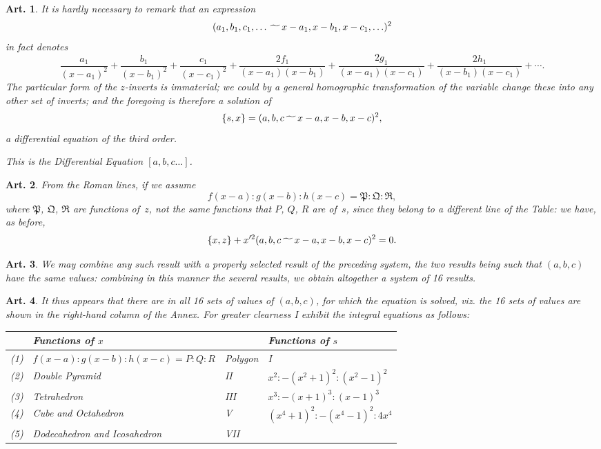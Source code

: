 \documentclass[11pt,a4paper]{article}
\theoremstyle{plain}
\newtheorem{art}{Art.}[section]
\begin{document}
\begin{art}
It is hardly necessary to remark that an expression
\[
(a_1, b_1, c_1, \ldots \,\raisebox{-.5ex}{$\widetilde{\phantom{aa}}$}\, x-a_1, x-b_1, x-c_1, \ldots)^2
\]
in fact denotes
\[
\frac{a_1}{(x-a_1)^2} + \frac{b_1}{(x-b_1)^2} + \frac{c_1}{(x-c_1)^2}
+ \frac{2f_1}{(x-a_1)(x-b_1)} + \frac{2g_1}{(x-a_1)(x-c_1)}
+ \frac{2h_1}{(x-b_1)(x-c_1)} + \cdots.
\]
The particular form of the $z$-inverts is immaterial; we could by a
general homographic transformation of the variable change these into any
other set of inverts; and the foregoing is therefore a solution of
\[
\{s, x\} = (a, b, c \,\raisebox{-.5ex}{$\widetilde{\phantom{aa}}$}\, x-a, x-b, x-c)^2,
\]
a differential equation of the third order.

This is the Differential Equation $[a, b, c \ldots]$.
\end{art}

\begin{art}
From the Roman lines, if we assume
\[
f(x-a) : g(x-b) : h(x-c) = \mathfrak{P} : \mathfrak{Q} : \mathfrak{R},
\]
where $\mathfrak{P}$, $\mathfrak{Q}$, $\mathfrak{R}$ are functions of~$z$, not the
same functions that $P$, $Q$, $R$ are of~$s$, since they belong to a
different line of the Table: we have, as before,
\[
\{x, z\} + x'^2 (a, b, c \,\raisebox{-.5ex}{$\widetilde{\phantom{aa}}$}\, x-a, x-b, x-c)^2 = 0.
\]
\end{art}

\begin{art}
We may combine any such result with a properly selected result of the
preceding system, the two results being such that $(a, b, c)$ have the
same values: combining in this manner the several results, we obtain
altogether a system of 16 results.
\end{art}

\begin{art}
It thus appears that there are in all 16 sets of values of $(a, b, c)$,
for which the equation is solved, viz. the 16 sets of values are shown in
the right-hand column of the Annex. For greater clearness I exhibit the
integral equations as follows:

\begin{center}
\begin{tabular}{|l|l|l|l|}
\hline
& Functions of $x$ & & Functions of $s$ \\
\hline
(1) & $f(x-a) : g(x-b) : h(x-c) = P : Q : R$ & Polygon & I \\
(2) & Double Pyramid & II & $x^2 : -(x^2+1)^2 : (x^2-1)^2$ \\
(3) & Tetrahedron & III & $x^3 : -(x+1)^3 : (x-1)^3$ \\
(4) & Cube and Octahedron & V & $(x^4+1)^2 : -(x^4-1)^2 : 4x^4$ \\
(5) & Dodecahedron and Icosahedron & VII & \\
\hline
\end{tabular}
\end{center}
\end{art}
\end{document}
